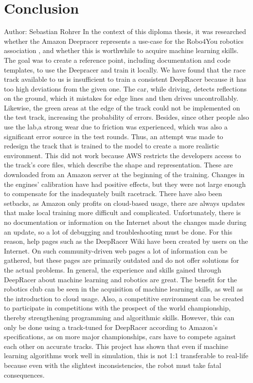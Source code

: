 \chapter{Conclusion}
Author: Sebastian Rohrer \newline
In the context of this diploma thesis, it was researched whether the Amazon Deepracer represents a use-case for the Robo4You robotics association , and whether this is worthwhile to acquire machine learning skills. The goal was to create a reference point, including documentation and code templates, to use the Deepracer and train it locally. We have found that the race track available to us is insufficient to train a consistent DeepRacer because it has too high deviations from the given one. The car, while driving, detects reflections on the ground, which it mistakes for edge lines and then drives uncontrollably. Likewise, the green areas at the edge of the track could not be implemented on the test track, increasing the probability of errors. Besides, since other people also use the lab,a strong wear due to friction was experienced, which was also a significant error source in the test rounds. Thus, an attempt was made to redesign the track that is trained to the model to create a more realistic environment. This did not work because AWS restricts the developers access to the track's core files, which describe the shape and representation. These are downloaded from an Amazon server at the beginning of the training. Changes in the engines' calibration have had positive effects, but they were not large enough to compensate for the inadequately built racetrack. There have also been setbacks, as Amazon only profits on cloud-based usage, there are always updates that make local training more difficult and complicated. Unfortunately, there is no documentation or information on the Internet about the changes made during an update, so a lot of debugging and troubleshooting must be done. For this reason, help pages such as the DeepRacer Wiki have been created by users on the Internet. On such community-driven web pages a lot of information can be gathered, but these pages are primarily outdated and do not offer solutions for the actual problems. In general, the experience and skills gained through DeepRacer about machine learning and robotics are great. The benefit for the robotics club can be seen in the acquisition of machine learning skills, as well as the introduction to cloud usage. Also, a competitive environment can be created to participate in competitions with the prospect of the world championship, thereby strengthening programming and algorithmic skills. However, this can only be done using a track-tuned for DeepRacer according to Amazon's specifications, as on more major championships, cars have to compete against each other on accurate tracks. This project has shown that even if machine learning algorithms work well in simulation, this is not 1:1 transferable to real-life because even with the slightest inconsistencies, the robot must take fatal consequences.

